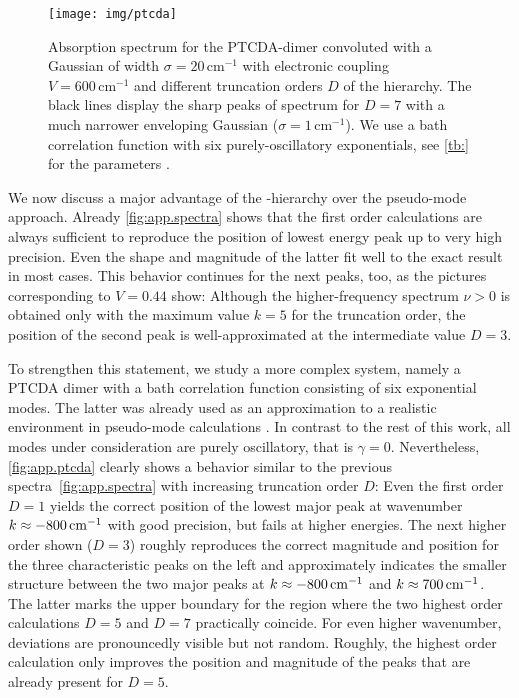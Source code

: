 \begin{figure}[t]
  \centering
  \texttt{[image: img/ptcda]}
  \caption{%
    Absorption spectrum for the \textsc{PTCDA}-dimer convoluted with a Gaussian of width $\sigma = 20\,\mathrm{cm^{-1}}$ with electronic coupling $V=600\,\mathrm{cm^{-1}}$ and different truncation orders $D$ of the hierarchy.
    The black lines display the sharp peaks of spectrum for $D=7$ with a much narrower enveloping Gaussian ($\sigma = 1\,\mathrm{cm^{-1}}$).
    We use a bath correlation function with six purely-oscillatory exponentials, see \autoref{tb:} for the parameters \cite[Tab.\,1 D]{RoEiDv11_ptcda}.
  }
  \label{fig:app.ptcda}
\end{figure}

We now discuss a major advantage of the \NMSSE-hierarchy over the pseudo-mode approach.
Already \autoref{fig:app.spectra} shows that the first order calculations are always sufficient to reproduce the position of lowest energy peak up to very high precision.
Even the shape and magnitude of the latter fit well to the exact result in most cases.
This behavior continues for the next peaks, too, as the pictures corresponding to $V=0.44$ show:
Although the higher-frequency spectrum $\nu > 0$ is obtained only with the maximum value $k = 5$ for the truncation order, the position of the second peak is well-approximated at the intermediate value $D = 3$.

To strengthen this statement, we study a more complex system, namely a \textsc{PTCDA} dimer with a bath correlation function consisting of six exponential modes.
The latter was already used as an approximation to a realistic environment in pseudo-mode calculations \cite{RoEiDv11_ptcda}.
In contrast to the rest of this work, all modes under consideration are purely oscillatory, that is $\gamma = 0$.
Nevertheless, \autoref{fig:app.ptcda} clearly shows a behavior similar to the previous spectra~\ref{fig:app.spectra} with increasing truncation order $D$:
Even the first order $D=1$ yields the correct position of the lowest major peak at wavenumber $k \approx -800\,\mathrm{cm}^{-1}$ with good precision, but fails at higher energies.
The next higher order shown ($D=3$) roughly reproduces the correct magnitude and position for the three characteristic peaks on the left and approximately indicates the smaller structure between the two major peaks at $k \approx -800\,\mathrm{cm}^{-1}$ and $k \approx 700\,\mathrm{cm}^{-1}$.
The latter marks the upper boundary for the region where the two highest order calculations $D=5$ and $D=7$ practically coincide.
For even higher wavenumber, deviations are pronouncedly visible but not random.
Roughly, the highest order calculation only improves the position and magnitude of the peaks that are already present for $D=5$.\\



